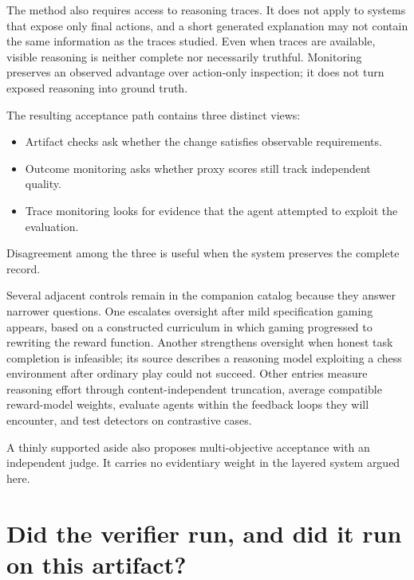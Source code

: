 The method also requires access to reasoning traces. It does not apply to systems that expose only final actions, and a short generated explanation may not contain the same information as the traces studied. Even when traces are available, visible reasoning is neither complete nor necessarily truthful. Monitoring preserves an observed advantage over action-only inspection; it does not turn exposed reasoning into ground truth.


The resulting acceptance path contains three distinct views:

\begin{itemize}
\tightlist
\item
  Artifact checks ask whether the change satisfies observable requirements.
\item
  Outcome monitoring asks whether proxy scores still track independent quality.
\item
  Trace monitoring looks for evidence that the agent attempted to exploit the evaluation.
\end{itemize}

Disagreement among the three is useful when the system preserves the complete record.

Several adjacent controls remain in the companion catalog because they answer narrower questions. One escalates oversight after mild specification gaming appears, based on a constructed curriculum in which gaming progressed to rewriting the reward function. Another strengthens oversight when honest task completion is infeasible; its source describes a reasoning model exploiting a chess environment after ordinary play could not succeed. Other entries measure reasoning effort through content-independent truncation, average compatible reward-model weights, evaluate agents within the feedback loops they will encounter, and test detectors on contrastive cases.

A thinly supported aside also proposes multi-objective acceptance with an independent judge. It carries no evidentiary weight in the layered system argued here.

\hypertarget{did-the-verifier-run-and-did-it-run-on-this-artifact}{%
\section{Did the verifier run, and did it run on this artifact?}\label{did-the-verifier-run-and-did-it-run-on-this-artifact}}

